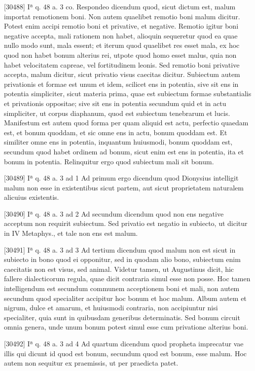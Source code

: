 \documentclass[10pt]{jsarticle} %
\begin{document}
[30488] Iª q. 48 a. 3 co. Respondeo dicendum quod, sicut dictum est, malum importat remotionem boni. Non autem quaelibet remotio boni malum dicitur. Potest enim accipi remotio boni et privative, et negative. Remotio igitur boni negative accepta, mali rationem non habet, alioquin sequeretur quod ea quae nullo modo sunt, mala essent; et iterum quod quaelibet res esset mala, ex hoc quod non habet bonum alterius rei, utpote quod homo esset malus, quia non habet velocitatem capreae, vel fortitudinem leonis. Sed remotio boni privative accepta, malum dicitur, sicut privatio visus caecitas dicitur. Subiectum autem privationis et formae est unum et idem, scilicet ens in potentia, sive sit ens in potentia simpliciter, sicut materia prima, quae est subiectum formae substantialis et privationis oppositae; sive sit ens in potentia secundum quid et in actu simpliciter, ut corpus diaphanum, quod est subiectum tenebrarum et lucis. Manifestum est autem quod forma per quam aliquid est actu, perfectio quaedam est, et bonum quoddam, et sic omne ens in actu, bonum quoddam est. Et similiter omne ens in potentia, inquantum huiusmodi, bonum quoddam est, secundum quod habet ordinem ad bonum, sicut enim est ens in potentia, ita et bonum in potentia. Relinquitur ergo quod subiectum mali sit bonum.

[30489] Iª q. 48 a. 3 ad 1 Ad primum ergo dicendum quod Dionysius intelligit malum non esse in existentibus sicut partem, aut sicut proprietatem naturalem alicuius existentis.

[30490] Iª q. 48 a. 3 ad 2 Ad secundum dicendum quod non ens negative acceptum non requirit subiectum. Sed privatio est negatio in subiecto, ut dicitur in IV Metaphys., et tale non ens est malum.

[30491] Iª q. 48 a. 3 ad 3 Ad tertium dicendum quod malum non est sicut in subiecto in bono quod ei opponitur, sed in quodam alio bono, subiectum enim caecitatis non est visus, sed animal. Videtur tamen, ut Augustinus dicit, hic fallere dialecticorum regula, quae dicit contraria simul esse non posse. Hoc tamen intelligendum est secundum communem acceptionem boni et mali, non autem secundum quod specialiter accipitur hoc bonum et hoc malum. Album autem et nigrum, dulce et amarum, et huiusmodi contraria, non accipiuntur nisi specialiter, quia sunt in quibusdam generibus determinatis. Sed bonum circuit omnia genera, unde unum bonum potest simul esse cum privatione alterius boni.

[30492] Iª q. 48 a. 3 ad 4 Ad quartum dicendum quod propheta imprecatur vae illis qui dicunt id quod est bonum, secundum quod est bonum, esse malum. Hoc autem non sequitur ex praemissis, ut per praedicta patet.
\end{document}
